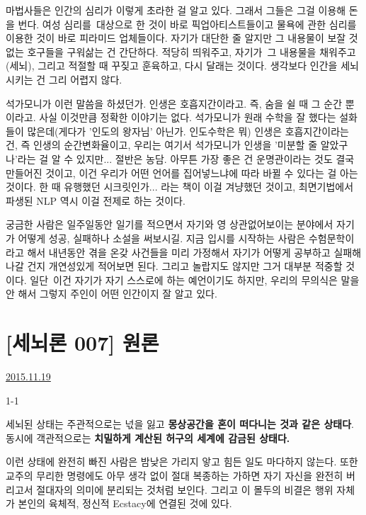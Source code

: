 마법사들은 인간의 심리가 이렇게 초라한 걸 알고 있다.
그래서 그들은 그걸 이용해 돈을 번다.
여성 심리를 대상으로 한 것이 바로 픽업아티스트들이고
물욕에 관한 심리를 이용한 것이 바로 피라미드 업체들이다.
자기가 대단한 줄 알지만 그 내용물이 보잘 것 없는 호구들을 구워삶는 건 간단하다.
적당히 띄워주고, 자기가 그 내용물을 채워주고(세뇌), 그리고 적절할 때 꾸짖고 훈육하고, 다시 달래는 것이다.
생각보다 인간을 세뇌시키는 건 그리 어렵지 않다.
\vspace{5mm}

석가모니가 이런 말씀을 하셨던가. 인생은 호흡지간이라고. 즉, 숨을 쉴 때 그 순간 뿐이라고.
사실 이것만큼 정확한 이야기는 없다. 석가모니가 원래 수학을 잘 했다는 설화들이 많은데(게다가 '인도의 왕자님' 아닌가. 인도수학은 뭐)
인생은 호흡지간이라는 건, 즉 인생의 순간변화율이고, 우리는 여기서 석가모니가 인생을 '미분할 줄 알았구나'라는 걸 알 수 있지만... 절반은 농담.
아무튼 가장 좋은 건 운명관이라는 것도 결국 만들어진 것이고, 이건 우리가 어떤 언어를 집어넣느냐에 따라 바뀔 수 있다는 걸 아는 것이다.
한 때 유행했던 시크릿인가... 라는 책이 이걸 겨냥했던 것이고, 최면기법에서 파생된 NLP 역시 이걸 전제로 하는 것이다.
\vspace{5mm}

궁금한 사람은 일주일동안 일기를 적으면서 자기와 영 상관없어보이는 분야에서 자기가 어떻게 성공, 실패하나 소설을 써보시길.
지금 입시를 시작하는 사람은 수험문학이라고 해서 내년동안 겪을 온갖 사건들을 미리 가정해서 자기가 어떻게 공부하고 실패해나갈 건지
개연성있게 적어보면 된다. 그리고 놀랍지도 않지만 그거 대부분 적중할 것이다.
일단 이건 자기가 자기 스스로에 하는 예언이기도 하지만, 우리의 무의식은 말을 안 해서 그렇지 주인이 어떤 인간이지 잘 알고 있다.
\vspace{5mm}






\section{[세뇌론 007] 원론}
\href{https://www.kockoc.com/Apoc/501415}{2015.11.19}

\vspace{5mm}

1-1
\vspace{5mm}

세뇌된 상태는
주관적으로는 넋을 잃고 \textbf{몽상공간을 혼이 떠다니는 것과 같은 상태다}.
동시에
객관적으로는 \textbf{치밀하게 계산된 허구의 세계에 감금된 상태다.}
\vspace{5mm}

이런 상태에 완전히 빠진 사람은 밤낮은 가리지 앟고 힘든 일도 마다하지 않는다.
또한 교주의 무리한 명령에도 아무 생각 없이 절대 복종하는 가하면
자기 자신을 완전히 버리고서 절대자의 의미에 분리되는 것처럼 보인다.
그리고 이 몰두의 비결은 행위 자체가 본인의 육체적, 정신적 Ecstacy에 연결된 것에 있다.
\vspace{5mm}

